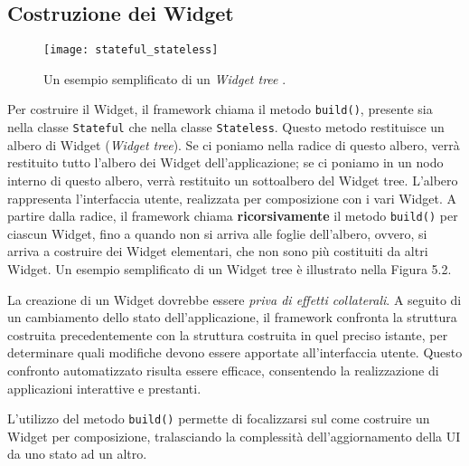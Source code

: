 \subsection{Costruzione dei Widget}
\begin{figure}
	\begin{center}
		\texttt{[image: stateful\_stateless]}
		\caption[Widget Stateful e Stateless]{Un esempio semplificato di un \textit{Widget tree} \cite{flutter_technical_overview}.}
		\label{figura:stateful_stateless}
	\end{center}
\end{figure}

Per costruire il Widget, il framework chiama il metodo \verb|build()|, presente sia nella classe \verb|Stateful| che nella classe \verb|Stateless|. Questo metodo restituisce un albero di Widget (\textit{Widget tree}). Se ci poniamo nella radice di questo albero, verrà restituito tutto l'albero dei Widget dell'applicazione; se ci poniamo in un nodo interno di questo albero, verrà restituito un sottoalbero del Widget tree. L'albero rappresenta l'interfaccia utente, realizzata per composizione con i vari Widget. A partire dalla radice, il framework chiama \textbf{ricorsivamente} il metodo \verb|build()| per ciascun Widget, fino a quando non si arriva alle foglie dell'albero, ovvero, si arriva a costruire dei Widget elementari, che non sono più costituiti da altri Widget. Un esempio semplificato di un Widget tree è illustrato nella Figura 5.2.

La creazione di un Widget dovrebbe essere \textit{priva di effetti collaterali}. A seguito di un cambiamento dello stato dell'applicazione, il framework confronta la struttura costruita precedentemente con la struttura costruita in quel preciso istante, per determinare quali modifiche devono essere apportate all'interfaccia utente. Questo confronto automatizzato risulta essere efficace, consentendo la realizzazione di applicazioni interattive e prestanti. 

L'utilizzo del metodo \verb|build()| permette di focalizzarsi sul come costruire un Widget per composizione, tralasciando la complessità dell'aggiornamento della UI da uno stato ad un altro.

